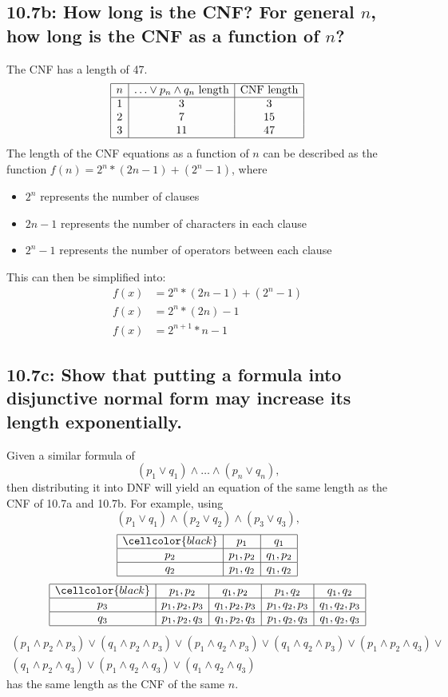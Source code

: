 \documentclass{article}
\begin{document}
\subsection*{10.7b: How long is the CNF? For general $n$, how long is the CNF as a function of $n$?}
The CNF has a length of 47.
\[\begin{array}{|c|c|c|}
\hline
n&\ldots\lor p_n\land q_n\text{ length}&\text{CNF length}\\
\hline
1&3&3\\
2&7&15\\
3&11&47\\
\hline
\end{array}\]
The length of the CNF equations as a function of $n$ can be described as the function $f(n)=2^n*(2n-1)+(2^n-1)$, where
\begin{itemize}
\item $2^n$ represents the number of clauses
\item $2n-1$ represents the number of characters in each clause
\item $2^n-1$ represents the number of operators between each clause
\end{itemize}
This can then be simplified into:
\begin{align*}
  f(x)&=2^n*(2n-1)+(2^n-1)\\
  f(x)&=2^n*(2n)-1\\
  f(x)&=2^{n+1}*n-1
\end{align*}
\subsection*{10.7c: Show that putting a formula into disjunctive normal form may increase its length exponentially.}
Given a similar formula of
\[(p_1\lor q_1)\land\ldots\land(p_n\lor q_n)\text{,}\]
then distributing it into DNF will yield an equation of the same length as the CNF of 10.7a and 10.7b. For example, using
\[(p_1\lor q_1)\land(p_2\lor q_2)\land(p_3\lor q_3)\text{,}\]
\[\begin{array}{|c|c|c|}
\hline
\cellcolor{black}&p_1&q_1\\
\hline
p_2&p_1,p_2&q_1,p_2\\
\hline
q_2&p_1,q_2&q_1,q_2\\
\hline
\end{array}\]
\[\begin{array}{|c|c|c|c|c|}
\hline
\cellcolor{black}&p_1,p_2&q_1,p_2&p_1,q_2&q_1,q_2\\
\hline
p_3&p_1,p_2,p_3&q_1,p_2,p_3&p_1,q_2,p_3&q_1,q_2,p_3\\
\hline
q_3&p_1,p_2,q_3&q_1,p_2,q_3&p_1,q_2,q_3&q_1,q_2,q_3\\
\hline
\end{array}\]
\begin{gather*}
  (p_1\land p_2\land p_3)\lor(q_1\land p_2\land p_3)\lor(p_1\land q_2\land p_3)\lor(q_1\land q_2\land p_3)\lor(p_1\land p_2\land q_3)\lor\\(q_1\land p_2\land q_3)\lor(p_1\land q_2\land q_3)\lor(q_1\land q_2\land q_3)
\end{gather*}
has the same length as the CNF of the same $n$.
\end{document}
